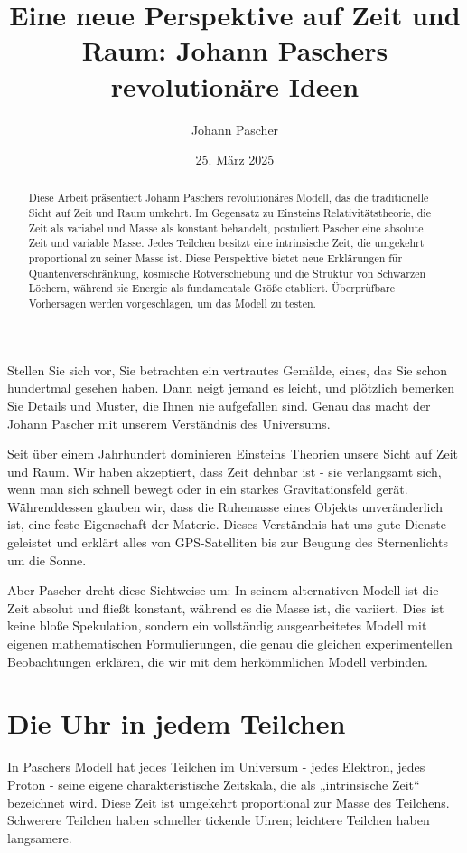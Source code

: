 \documentclass[a4paper,12pt]{article}
\title{Eine neue Perspektive auf Zeit und Raum: Johann Paschers revolutionäre Ideen}
\author{Johann Pascher}
\date{25. März 2025}
\begin{document}
	
	\maketitle
	
	\begin{abstract}
		Diese Arbeit präsentiert Johann Paschers revolutionäres Modell, das die traditionelle Sicht auf Zeit und Raum umkehrt. Im Gegensatz zu Einsteins Relativitätstheorie, die Zeit als variabel und Masse als konstant behandelt, postuliert Pascher eine absolute Zeit und variable Masse. Jedes Teilchen besitzt eine intrinsische Zeit, die umgekehrt proportional zu seiner Masse ist. Diese Perspektive bietet neue Erklärungen für Quantenverschränkung, kosmische Rotverschiebung und die Struktur von Schwarzen Löchern, während sie Energie als fundamentale Größe etabliert. Überprüfbare Vorhersagen werden vorgeschlagen, um das Modell zu testen.
	\end{abstract}
	
	\tableofcontents
	\newpage
	
	Stellen Sie sich vor, Sie betrachten ein vertrautes Gemälde, eines, das Sie schon hundertmal gesehen haben. Dann neigt jemand es leicht, und plötzlich bemerken Sie Details und Muster, die Ihnen nie aufgefallen sind. Genau das macht der Johann Pascher mit unserem Verständnis des Universums.
	
	Seit über einem Jahrhundert dominieren Einsteins Theorien unsere Sicht auf Zeit und Raum. Wir haben akzeptiert, dass Zeit dehnbar ist - sie verlangsamt sich, wenn man sich schnell bewegt oder in ein starkes Gravitationsfeld gerät. Währenddessen glauben wir, dass die Ruhemasse eines Objekts unveränderlich ist, eine feste Eigenschaft der Materie. Dieses Verständnis hat uns gute Dienste geleistet und erklärt alles von GPS-Satelliten bis zur Beugung des Sternenlichts um die Sonne.
	
	Aber Pascher dreht diese Sichtweise um: In seinem alternativen Modell ist die Zeit absolut und fließt konstant, während es die Masse ist, die variiert. Dies ist keine bloße Spekulation, sondern ein vollständig ausgearbeitetes Modell mit eigenen mathematischen Formulierungen, die genau die gleichen experimentellen Beobachtungen erklären, die wir mit dem herkömmlichen Modell verbinden.
	
	\section{Die Uhr in jedem Teilchen}
	In Paschers Modell hat jedes Teilchen im Universum - jedes Elektron, jedes Proton - seine eigene charakteristische Zeitskala, die als „intrinsische Zeit“ bezeichnet wird. Diese Zeit ist umgekehrt proportional zur Masse des Teilchens. Schwerere Teilchen haben schneller tickende Uhren; leichtere Teilchen haben langsamere.
	
\end{document}
